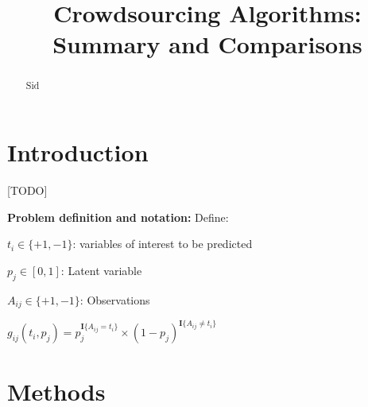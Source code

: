 \documentclass[11pt]{article}
\begin{document}
%

%





\title{Crowdsourcing Algorithms: \\Summary and Comparisons}

\maketitle

\begin{abstract}
Sid
\end{abstract}

\section{Introduction}
[TODO]

\textbf{Problem definition and notation: }
Define: 

$t_i \in \{ +1, -1 \} $: variables of interest to be predicted

$p_j \in [0,1]$: Latent variable 

$A_{ij}\in \{+1, -1\}$: Observations 

$
g_{ij}(t_i,p_j) = p_j^ {  \mathbf{I} \lbrace A_{ij} = t_i \rbrace } \times (1-p_j)^{ \mathbf{I} \lbrace A_{ij} \neq t_i \rbrace}
$


\section{Methods}
\end{document}
